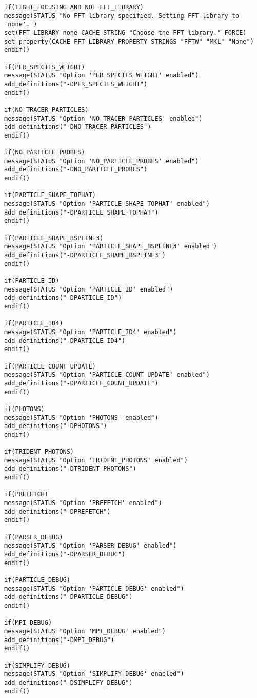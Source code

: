 \begin{lstlisting}[style=FORTRAN, caption=CMakeLists]
if(TIGHT_FOCUSING AND NOT FFT_LIBRARY)
message(STATUS "No FFT library specified. Setting FFT library to 'none'.")
set(FFT_LIBRARY none CACHE STRING "Choose the FFT library." FORCE)
set_property(CACHE FFT_LIBRARY PROPERTY STRINGS "FFTW" "MKL" "None")
endif()

if(PER_SPECIES_WEIGHT)
message(STATUS "Option 'PER_SPECIES_WEIGHT' enabled")
add_definitions("-DPER_SPECIES_WEIGHT")
endif()

if(NO_TRACER_PARTICLES)
message(STATUS "Option 'NO_TRACER_PARTICLES' enabled")
add_definitions("-DNO_TRACER_PARTICLES")
endif()

if(NO_PARTICLE_PROBES)
message(STATUS "Option 'NO_PARTICLE_PROBES' enabled")
add_definitions("-DNO_PARTICLE_PROBES")
endif()

if(PARTICLE_SHAPE_TOPHAT)
message(STATUS "Option 'PARTICLE_SHAPE_TOPHAT' enabled")
add_definitions("-DPARTICLE_SHAPE_TOPHAT")
endif()

if(PARTICLE_SHAPE_BSPLINE3)
message(STATUS "Option 'PARTICLE_SHAPE_BSPLINE3' enabled")
add_definitions("-DPARTICLE_SHAPE_BSPLINE3")
endif()

if(PARTICLE_ID)
message(STATUS "Option 'PARTICLE_ID' enabled")
add_definitions("-DPARTICLE_ID")
endif()

if(PARTICLE_ID4)
message(STATUS "Option 'PARTICLE_ID4' enabled")
add_definitions("-DPARTICLE_ID4")
endif()

if(PARTICLE_COUNT_UPDATE)
message(STATUS "Option 'PARTICLE_COUNT_UPDATE' enabled")
add_definitions("-DPARTICLE_COUNT_UPDATE")
endif()

if(PHOTONS)
message(STATUS "Option 'PHOTONS' enabled")
add_definitions("-DPHOTONS")
endif()

if(TRIDENT_PHOTONS)
message(STATUS "Option 'TRIDENT_PHOTONS' enabled")
add_definitions("-DTRIDENT_PHOTONS")
endif()

if(PREFETCH)
message(STATUS "Option 'PREFETCH' enabled")
add_definitions("-DPREFETCH")
endif()

if(PARSER_DEBUG)
message(STATUS "Option 'PARSER_DEBUG' enabled")
add_definitions("-DPARSER_DEBUG")
endif()

if(PARTICLE_DEBUG)
message(STATUS "Option 'PARTICLE_DEBUG' enabled")
add_definitions("-DPARTICLE_DEBUG")
endif()

if(MPI_DEBUG)
message(STATUS "Option 'MPI_DEBUG' enabled")
add_definitions("-DMPI_DEBUG")
endif()

if(SIMPLIFY_DEBUG)
message(STATUS "Option 'SIMPLIFY_DEBUG' enabled")
add_definitions("-DSIMPLIFY_DEBUG")
endif()


\end{lstlisting}
